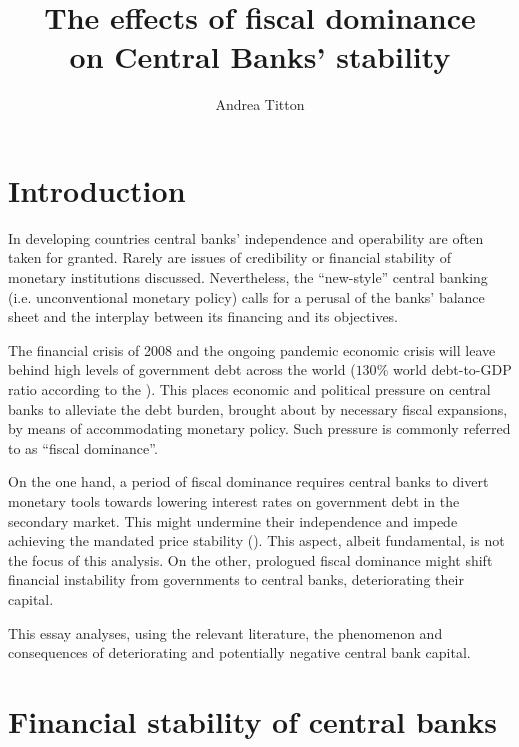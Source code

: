\documentclass[american]{scrartcl}
\title{The effects of fiscal dominance \\ on Central Banks' stability}
\author{Andrea Titton}
\begin{document}
\clearpage
\thispagestyle{empty}
\maketitle
\clearpage


\iffalse
    History | Theory of CB dividends | Financial stability under deferred assets |
    Expectations of Inflation | Effects on global banks
\fi


\section{Introduction}

In developing countries central banks' independence and operability are often taken for granted. Rarely are issues of credibility or financial stability of monetary institutions discussed. Nevertheless, the ``new-style'' central banking (i.e. unconventional monetary policy) calls for a perusal of the banks' balance sheet and the interplay between its financing and its objectives.

The financial crisis of 2008 and the ongoing pandemic economic crisis will leave behind high levels of government debt across the world ($130\%$ world debt-to-GDP ratio according to the \cite{WEO2020}). This places economic and political pressure on central banks to alleviate the debt burden, brought about by necessary fiscal expansions, by means of accommodating monetary policy. Such pressure is commonly referred to as ``fiscal dominance''.

On the one hand, a period of fiscal dominance requires central banks to divert monetary tools towards lowering interest rates on government debt in the secondary market. This might undermine their independence and impede achieving the mandated price stability (\cite{Schnabel2020}). This aspect, albeit fundamental, is not the focus of this analysis. On the other, prologued fiscal dominance might shift financial instability from governments to central banks, deteriorating their capital. %

This essay analyses, using the relevant literature, the phenomenon and consequences of deteriorating and potentially negative central bank capital. %

\section{Financial stability of central banks}
\end{document}
